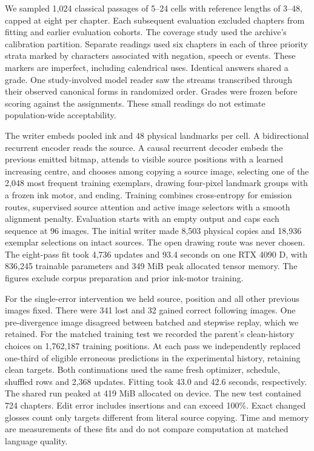 \documentclass[12pt,a4paper]{article}
\providecommand{\DIFadd}[1]{{\protect\color{blue} \sf #1}} %
\begin{document}
\DIFadd{We sampled 1,024 classical passages of 5--24 cells with reference lengths of 3--48, capped at eight per chapter. Each subsequent evaluation excluded chapters from fitting and earlier evaluation cohorts. The coverage study used the archive's calibration partition. Separate readings used six chapters in each of three priority strata marked by characters associated with negation, speech or events. These markers are imperfect, including calendrical uses. Identical answers shared a grade. One study-involved model reader saw the streams transcribed through their observed canonical forms in randomized order. Grades were frozen before scoring against the assignments. These small readings do not estimate population-wide acceptability.
}

\DIFadd{The writer embeds pooled ink and 48 physical landmarks per cell. A bidirectional recurrent encoder reads the source. A causal recurrent decoder embeds the previous emitted bitmap, attends to visible source positions with a learned increasing centre, and chooses among copying a source image, selecting one of the 2,048 most frequent training exemplars, drawing four-pixel landmark groups with a frozen ink motor, and ending. Training combines cross-entropy for emission routes, supervised source attention and active image selectors with a smooth alignment penalty. Evaluation starts with an empty output and caps each sequence at 96 images. The initial writer made 8,503 physical copies and 18,936 exemplar selections on intact sources. The open drawing route was never chosen. The eight-pass fit took 4,736 updates and 93.4 seconds on one RTX 4090 D, with 836,245 trainable parameters and 349 MiB peak allocated tensor memory. The figures exclude corpus preparation and prior ink-motor training.
}

\DIFadd{For the single-error intervention we held source, position and all other previous images fixed. There were 341 lost and 32 gained correct following images. One pre-divergence image disagreed between batched and stepwise replay, which we retained. For the matched training test we recorded the parent's clean-history choices on 1,762,187 training positions. At each pass we independently replaced one-third of eligible erroneous predictions in the experimental history, retaining clean targets. Both continuations used the same fresh optimizer, schedule, shuffled rows and 2,368 updates. Fitting took 43.0 and 42.6 seconds, respectively. The shared run peaked at 419 MiB allocated on device. The new test contained 724 chapters. Edit error includes insertions and can exceed 100\%. Exact changed glosses count only targets different from literal source copying. Time and memory are measurements of these fits and do not compare computation at matched language quality.
}
\end{document}
